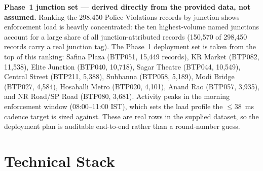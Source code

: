 \documentclass[11pt,a4paper]{article}
\begin{document}
\textbf{Phase~1 junction set --- derived directly from the provided data, not assumed.} Ranking the 298,450 Police Violations records by junction shows enforcement load is heavily concentrated: the ten highest-volume named junctions account for a large share of all junction-attributed records (150,570 of 298,450 records carry a real junction tag). The Phase~1 deployment set is taken from the top of this ranking: Safina Plaza (BTP051, 15{,}449 records), KR Market (BTP082, 11{,}538), Elite Junction (BTP040, 10{,}718), Sagar Theatre (BTP044, 10{,}549), Central Street (BTP211, 5{,}388), Subbanna (BTP058, 5{,}189), Modi Bridge (BTP027, 4{,}584), Hosahalli Metro (BTP020, 4{,}101), Anand Rao (BTP057, 3{,}935), and NR Road/SP Road (BTP080, 3{,}681). Activity peaks in the morning enforcement window (08:00--11:00 IST), which sets the load profile the $\leq$38~ms cadence target is sized against. These are real rows in the supplied dataset, so the deployment plan is auditable end-to-end rather than a round-number guess.

\section{Technical Stack}
\end{document}
